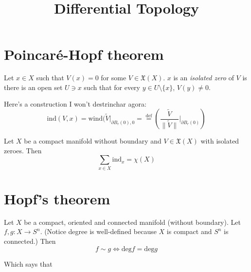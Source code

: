 



\title{Differential Topology}
\maketitle

\label{section-phantom}

\tableofcontents

\section{Poincaré-Hopf theorem}
\label{section-Poincare-Hopf-theorem}

\begin{definition}
\label{definition-isolated-zero-vector-field}
Let $x \in X$ such that $V(x)=0$ for some $V \in \mathfrak{X}(X)$. $x$ is an
{\it isolated zero} of  $V$ is there is an open set $U \ni x$ such that for
every $y \in U\setminus \{x\}$, $V(y) \neq 0$.
\end{definition}

\begin{definition}
\label{definition-degree-zero-vector-field}
Here's a construction I won't destrinchar agora:
$$
\text{ind}(V,x)=\text{wind}(\tilde{V}|_{\partial
B_r(0),0}=\overset{\text{def}}{=}\left(\frac{\tilde{V}}{\|\tilde{V}\|}\Big|_{\partial
B_r(0)}\right)
$$
\end{definition}

\begin{theorem}
\label{theorem-Poincare-Hopf}
Let $X$ be a compact manifold without boundary and $V \in \mathfrak{X}(X)$ with
isolated zeroes. Then
$$
\sum_{x \in X}\text{ind}_x=\chi(X)
$$
\end{theorem}

\section{Hopf's theorem}
\label{section-Hopf-theorem}

\begin{theorem}[Hopf]
\label{theorem-Hopf}
Let $X$ be a compact, oriented and connected manifold (without boundary). Let
$f,g:X \to S^n$. (Notice degree is well-defined because $X$ is compact and
$S^n$ is connected.) Then
$$
f \sim g \iff \text{deg}f=\text{deg}g
$$
\end{theorem}

Which says that 






